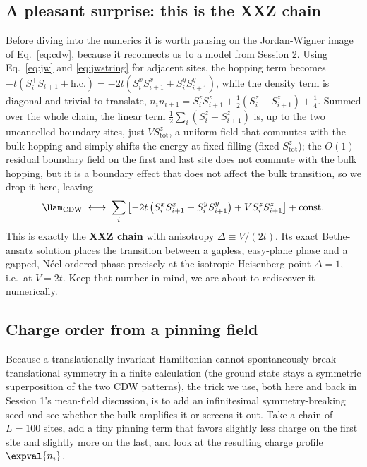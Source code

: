 \documentclass[all_sessions.tex]{subfiles}
\begin{document}
\subsection{A pleasant surprise: this is the XXZ chain}
Before diving into the numerics it is worth pausing on the Jordan-Wigner image of
Eq.~\eqref{eq:cdw}, because it reconnects us to a model from Session 2. Using
Eq.~\eqref{eq:jw} and \eqref{eq:jwstring} for adjacent sites, the hopping term becomes
$-t(S_i^+S_{i+1}^-+\mathrm{h.c.}) = -2t(S_i^xS_{i+1}^x+S_i^yS_{i+1}^y)$, while the density term is
diagonal and trivial to translate, $n_in_{i+1} = S_i^zS_{i+1}^z + \tfrac12(S_i^z+S_{i+1}^z) +
\tfrac14$. Summed over the whole chain, the linear term $\tfrac12\sum_i(S_i^z+S_{i+1}^z)$ is, up to
the two uncancelled boundary sites, just $VS_{\mathrm{tot}}^z$, a uniform field that commutes with
the bulk hopping and simply shifts the energy at fixed filling (fixed $S_{\mathrm{tot}}^z$); the
$O(1)$ residual boundary field on the first and last site does not commute with the bulk hopping,
but it is a boundary effect that does not affect the bulk transition, so we drop it here, leaving
\begin{equation}
  \Ham_{\mathrm{CDW}} \;\longleftrightarrow\;
  \sum_i\left[-2t\left(S_i^xS_{i+1}^x+S_i^yS_{i+1}^y\right) + V S_i^zS_{i+1}^z\right] + \mathrm{const.}
  \label{eq:xxzferm}
\end{equation}
This is exactly the \textbf{XXZ chain} with anisotropy $\Delta \equiv V/(2t)$. Its exact
Bethe-ansatz solution places the transition between a gapless, easy-plane phase and a gapped,
N\'eel-ordered phase precisely at the isotropic Heisenberg point $\Delta=1$, i.e.\ at $V=2t$. Keep
that number in mind, we are about to rediscover it numerically.

\subsection{Charge order from a pinning field}
Because a translationally invariant Hamiltonian cannot spontaneously break translational symmetry
in a finite calculation (the ground state stays a symmetric superposition of the two CDW patterns),
the trick we use, both here and back in Session 1's mean-field discussion, is to add an
infinitesimal symmetry-breaking seed and see whether the bulk amplifies it or screens it out. Take a
chain of $L=100$ sites, add a tiny pinning term that favors slightly less charge on the first site
and slightly more on the last, and look at the resulting charge profile $\expval{n_i}$.
\end{document}
